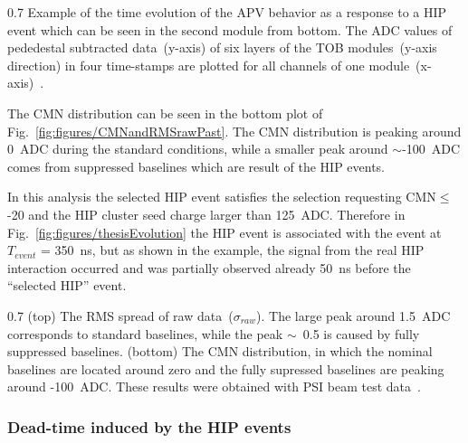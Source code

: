                  {0.7}       %
                 {Example of the time evolution of the APV behavior as a response to a HIP event which can be seen in the second module from bottom. The ADC values of pededestal subtracted data~(y-axis) of six layers of the TOB modules~(y-axis direction) in four time-stamps are plotted for all channels of one module~(x-axis)~\cite{Bainbridge:2004jc}.} %

The CMN distribution can be seen in the bottom plot of Fig.~\ref{fig:figures/CMNandRMSrawPast}. The CMN distribution is peaking around 0~ADC during the standard conditions, while a smaller peak around $\sim$-100~ADC comes from suppressed baselines which are result of the HIP events. 

In this analysis the selected HIP event satisfies the selection requesting CMN$\leq$-20 and the HIP cluster seed charge larger than 125~ADC. Therefore in Fig.~\ref{fig:figures/thesisEvolution} the HIP event is associated with the event at $T_{event}$ = 350~ns, but as shown in the example, the signal from the real HIP interaction occurred and was partially observed already 50~ns before the ``selected HIP'' event.

                 {0.7}       %
                 {(top) The RMS spread of raw data~($\sigma_{raw}$). The large peak around 1.5~ADC corresponds to standard baselines, while the peak $\sim$~0.5 is caused by fully suppressed baselines. (bottom) The CMN distribution, in which the nominal baselines are located around zero and the fully supressed baselines are peaking around -100~ADC. These results were obtained with PSI beam test data~\cite{Bainbridge:2004jc}.} %



\subsubsection{Dead-time induced by the HIP events~\label{sec:deadtimePast}}

